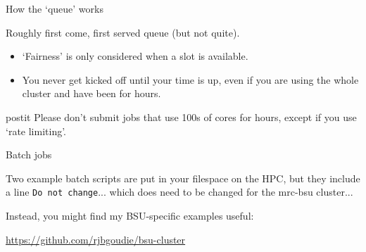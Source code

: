 \documentclass[t,10pt]{beamer}
\newenvironment{highlightblock}[0]%
  {\begin{beamercolorbox}[sep=1em]{postit}}%
  {\end{beamercolorbox}}
\begin{document}
\begin{frame}{How the `queue' works}

Roughly \alert{first come, first served} queue (but not quite).

\bigskip
\begin{itemize}
\item `Fairness' is only considered when a slot is available.
\item You never get kicked off until your time is up, even if you are using the whole cluster and have been for hours.
\end{itemize}

\bigskip
\begin{highlightblock}
Please don't submit jobs that use 100s of cores for hours, except if you use `rate limiting'.
\end{highlightblock}

\end{frame}


\begin{frame}[fragile]{Batch jobs}

Two example batch scripts are put in your filespace on the HPC, but they include a line \texttt{Do not change}... which \alert{does need to be changed} for the mrc-bsu cluster...

\bigskip
Instead, you might find my BSU-specific examples useful:

\bigskip
\begin{centering}
\url{https://github.com/rjbgoudie/bsu-cluster}
\end{centering}

\end{frame}
\end{document}
